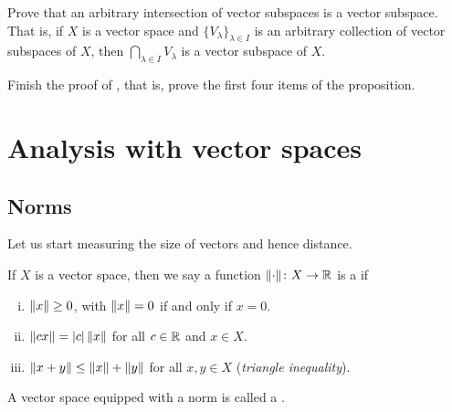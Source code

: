 \begin{exercise}
Prove that an arbitrary intersection of vector subspaces
is a vector subspace.
That is, if $X$ is a vector space and
$\{ V_\lambda \}_{\lambda \in I}$ is
an arbitrary collection of vector subspaces of $X$,
then
$\bigcap_{\lambda \in I} V_\lambda$ is a vector subspace of $X$.
\end{exercise}

\begin{exercise}[Easy] \label{exercise:LXYvs}
Finish the proof of , that is, prove the first four
items of the proposition.
\end{exercise}


\sectionnewpage
\section{Analysis with vector spaces}
\label{sec:normsmatsdets}



\subsection{Norms}

Let us start measuring the size of vectors and hence distance.

\begin{defn}
If $X$ is a vector space, then we say
a function $\lVert {\cdot} \rVert \colon X \to {\mathbb{R}}$ is a
\emph{} if
\begin{enumerate}[(i)]
\item \label{defn:norm:i} $\lVert {x} \rVert \geq 0$, with $\lVert {x} \rVert=0$ if and only if $x=0$.
\item \label{defn:norm:ii} $\lVert {cx} \rVert = \lvert {c} \rvert \, \lVert {x} \rVert$ for all $c \in {\mathbb{R}}$ and $x \in X$.
\item \label{defn:norm:iii} $\lVert {x+y} \rVert \leq \lVert {x} \rVert+\lVert {y} \rVert$ for all
$x,y \in X$
\qquad (\emph{triangle inequality}).
\end{enumerate}
A vector space equipped with a norm is called a
\emph{}.
\end{defn}

